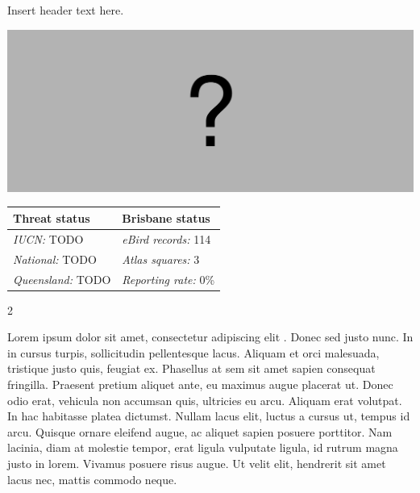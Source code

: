 \documentclass[12pt,openany,oneside]{book}
\let\origfigure\figure
\let\endorigfigure\endfigure
\renewenvironment{figure}[1][2] {
  \expandafter\origfigure\expandafter[H]
} {
  \endorigfigure
}
\let\Begin\begin
\let\End\end
\theoremstyle{definition}
\theoremstyle{definition}
\theoremstyle{definition}
\theoremstyle{remark}
\begin{document}

Insert header text here.

\begin{figure}
\centering
\includegraphics[width=\textwidth,keepaspectratio=true]{assets/misc/missing-profile.png}
\caption{Insert caption here.}
\end{figure}

\begin{tabu} to 
\toprule
Threat status & Brisbane status\\
\midrule
\textit{IUCN:} TODO & \textit{eBird records:} 114\\
\textit{National:} TODO & \textit{Atlas squares:} 3\\
\textit{Queensland:} TODO & \textit{Reporting rate:} 0\%\\
\bottomrule
\end{tabu} 
\vspace{0.15cm}

\Begin{multicols}{2}

Lorem ipsum dolor sit amet, consectetur adipiscing elit
\citep{rexample1, rexample2, rexample3}. Donec sed justo nunc. In in
cursus turpis, sollicitudin pellentesque lacus. Aliquam et orci
malesuada, tristique justo quis, feugiat ex. Phasellus at sem sit amet
sapien consequat fringilla. Praesent pretium aliquet ante, eu maximus
augue placerat ut. Donec odio erat, vehicula non accumsan quis,
ultricies eu arcu. Aliquam erat volutpat. In hac habitasse platea
dictumst. Nullam lacus elit, luctus a cursus ut, tempus id arcu. Quisque
ornare eleifend augue, ac aliquet sapien posuere porttitor. Nam lacinia,
diam at molestie tempor, erat ligula vulputate ligula, id rutrum magna
justo in lorem. Vivamus posuere risus augue. Ut velit elit, hendrerit
sit amet lacus nec, mattis commodo neque.

\End{multicols}

\clearpage
\end{document}

